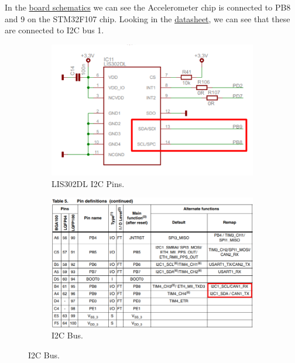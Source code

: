 \documentclass{article}
\begin{document}
In the \href{http://www.keil.com/mcbstm32c/mcbstm32c-base-board-schematics.pdf}{board schematics}
we can see the Accelerometer chip is connected to PB8 and 9 on the STM32F107 chip.
Looking in the \href{http://www.keil.com/dd/docs/datashts/st/stm32f105(7)xx_ds.pdf}{datasheet},
we can see that these are connected to I2C bus 1.
\begin{figure}[H]
    \centering
    \begin{subfigure}[b]{0.45\linewidth}
        \includegraphics[width=\linewidth]{pics/I2CPinsDiagram.png}
        \caption{LIS302DL I2C Pins.}
    \end{subfigure}
    \begin{subfigure}[b]{0.45\linewidth}
        \includegraphics[width=\linewidth]{pics/PB89I2C1.png}
        \caption{I2C Bus.}
    \end{subfigure}
    \label{fig:I2CSettings}
\end{figure}
\end{document}
